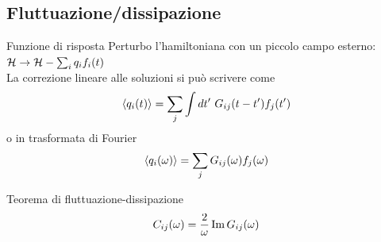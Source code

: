 \documentclass[10pt]{beamer}
\begin{document}
\subsection{Fluttuazione/dissipazione}
\begin{frame}{Funzione di risposta}
Perturbo l'hamiltoniana con un piccolo campo esterno: $ \mathcal{H} \rightarrow \mathcal{H} - \sum_i q_i f_i(t)$\\
La correzione lineare alle soluzioni si può scrivere come
\begin{equation*}
  \mean{q_i(t)} = \sum_j \int dt' \ G_{ij}(t-t')f_j(t') 
\end{equation*}
o in trasformata di Fourier
\begin{equation*}
  \left \langle q_i(\omega) \right \rangle = \sum_j G_{ij}(\omega)f_j(\omega) 
\end{equation*}

\pause
\begin{block}{Teorema di fluttuazione-dissipazione}
\begin{equation*}
  C_{ij}(\omega) = \frac{2}{\omega}\operatorname{Im} G_{ij}(\omega)
\end{equation*}
  
\end{block}

\end{frame}
\end{document}
